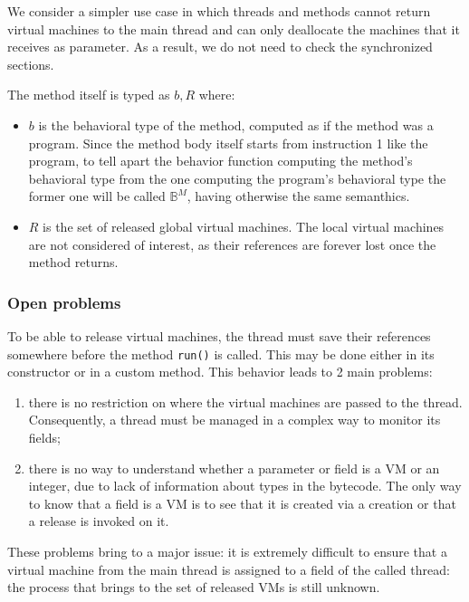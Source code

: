 \documentclass{amsart}
\newcommand{\bB}[1]{\mathbb{B}_{#1}}
\numberwithin{equation}{section}
\theoremstyle{plain} %
\theoremstyle{definition}
\theoremstyle{remark}
\begin{document}
We consider a simpler use case in which threads and methods cannot return virtual machines to the main thread and can only deallocate the machines that it receives as parameter. As a result, we do not need to check the synchronized sections.

The method itself is typed as $b, R$ where:
\begin{itemize}
\item $b$ is the behavioral type of the method, computed as if the method was a program. Since the method body itself starts from instruction 1 like the program, to tell apart the behavior function computing the method's behavioral type from the one computing the program's behavioral type the former one will be called $\bB{}^M$, having otherwise the same semanthics.
\item $R$ is the set of released global virtual machines. The local virtual machines are not considered of interest, as their references are forever lost once the method returns.
\end{itemize}

\pagebreak
\subsubsection{Open problems}
To be able to release virtual machines, the thread must save their references somewhere before the method \texttt{run()} is called. This may be done either in its constructor or in a custom method. This behavior leads to 2 main problems:
\begin{enumerate}
\item there is no restriction on where the virtual machines are passed to the thread. Consequently, a thread must be managed in a complex way to monitor its fields;
\item there is no way to understand whether a parameter or field is a VM or an integer, due to lack of information about types in the bytecode. The only way to know that a field is a VM is to see that it is created via a creation or that a release is invoked on it.
\end{enumerate}
These problems bring to a major issue: it is extremely difficult to ensure that a virtual machine from the main thread is assigned to a field of the called thread: the process that brings to the set of released VMs is still unknown.
\end{document}
